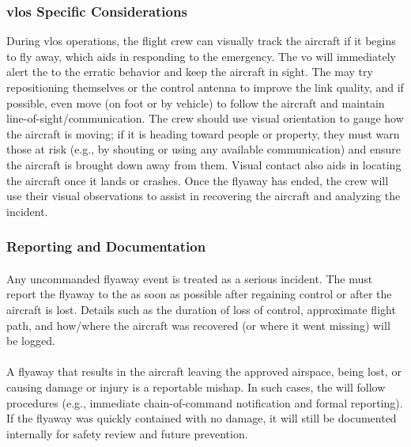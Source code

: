             \subsubsection{\ac{vlos} Specific Considerations} During \ac{vlos} operations, the flight crew can visually track the aircraft if it begins to fly away, which aids in responding to the emergency. The \ac{vo} will immediately alert the  to the erratic behavior and keep the aircraft in sight. The  may try repositioning themselves or the control antenna to improve the link quality, and if possible, even move (on foot or by vehicle) to follow the aircraft and maintain line-of-sight/communication. The crew should use visual orientation to gauge how the aircraft is moving; if it is heading toward people or property, they must warn those at risk (e.g., by shouting or using any available communication) and ensure the aircraft is brought down away from them. Visual contact also aids in locating the aircraft once it lands or crashes. Once the flyaway has ended, the crew will use their visual observations to assist in recovering the aircraft and analyzing the incident.
 
            \subsubsection{Reporting and Documentation}
            
                \paragraph{} Any uncommanded flyaway event is treated as a serious incident. The  must report the flyaway to the  as soon as possible after regaining control or after the aircraft is lost. Details such as the duration of loss of control, approximate flight path, and how/where the aircraft was recovered (or where it went missing) will be logged.
                
                \paragraph{} A flyaway that results in the aircraft leaving the approved airspace, being lost, or causing damage or injury is a reportable mishap. In such cases, the  will follow  procedures (e.g., immediate chain-of-command notification and formal reporting). If the flyaway was quickly contained with no damage, it will still be documented internally for safety review and future prevention.
 
